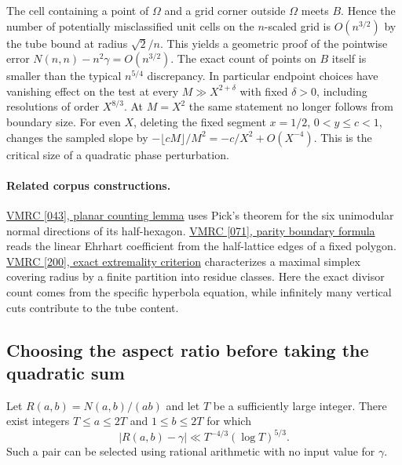 \documentclass[11pt,a4paper,oneside,openany]{report}
\theoremstyle{remark}\newtheorem{remark}[theorem]{Remark}
\numberwithin{equation}{section}
\begin{document}
The cell containing a point of $\Omega$ and a grid corner outside
$\Omega$ meets $B$. Hence the number of potentially misclassified
unit cells on the $n$-scaled grid is $O(n^{3/2})$ by the tube bound
at radius $\sqrt2/n$. This yields a geometric proof of the pointwise
error $N(n,n)-n^2\gamma=O(n^{3/2})$. The exact count of points
on $B$ itself is smaller than the typical $n^{5/4}$ discrepancy.
In particular endpoint choices have vanishing effect on the test
at every $M\gg X^{2+\delta}$ with fixed $\delta>0$, including
resolutions of order $X^{8/3}$. At $M=X^2$ the same statement no
longer follows from boundary size. For even $X$, deleting the fixed
segment $x=1/2$, $0<y\le c<1$, changes the sampled slope by
$-\lfloor cM\rfloor/M^2=-c/X^2+O(X^{-4})$. This is the critical
size of a quadratic phase perturbation.

\paragraph{Related corpus constructions.} \href{https://github.com/QEEDDD/Verifiable-Mathematical-Reasoning-Corpus/blob/c2ac34ea4622778187173f41bb1996deee8081b7/\%5B043\%5D\%20Local\%20Certificates\%2C\%20Stability\%2C\%20and\%20Concavity.tex\#L14282}{VMRC [043], planar counting lemma} uses Pick's theorem for the six unimodular normal directions of its half-hexagon. \href{https://github.com/QEEDDD/Verifiable-Mathematical-Reasoning-Corpus/blob/c2ac34ea4622778187173f41bb1996deee8081b7/\%5B071\%5D\%20Obstructions_Polytopes_Peak_Transfer.tex\#L486}{VMRC [071], parity boundary formula} reads the linear Ehrhart coefficient from the half-lattice edges of a fixed polygon. \href{https://github.com/QEEDDD/Verifiable-Mathematical-Reasoning-Corpus/blob/c2ac34ea4622778187173f41bb1996deee8081b7/\%5B200\%5D\%20lattice_covering_flows.tex\#L575}{VMRC [200], exact extremality criterion} characterizes a maximal simplex covering radius by a finite partition into residue classes. Here the exact divisor count comes from the specific hyperbola equation, while infinitely many vertical cuts contribute to the tube content.
\subsection{Choosing the aspect ratio before taking the quadratic sum}
Let $R(a,b)=N(a,b)/(ab)$ and let $T$ be a sufficiently large integer.
There exist integers $T\le a\le 2T$ and $1\le b\le 2T$ for which
\begin{equation}\label{ch5:eq:adaptive-aspect}
 |R(a,b)-\gamma|\ll T^{-4/3}(\log T)^{5/3}.
\end{equation}
Such a pair can be selected using rational arithmetic with no input value for $\gamma$.
\end{document}
